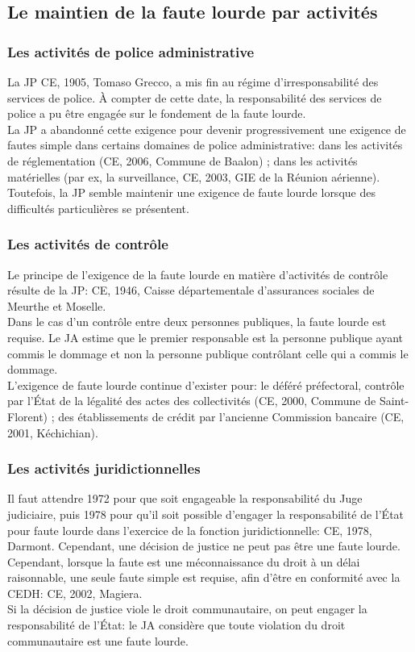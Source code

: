 \documentclass[10pt, a4paper, openany]{book}
\begin{document}
\subsection{Le maintien de la faute lourde par activités}

\subsubsection{Les activités de police administrative}

La JP CE, 1905, Tomaso Grecco, a mis fin au régime d'irresponsabilité des services de police. À compter de cette date, la responsabilité des services de police a pu être engagée sur le fondement de la faute lourde. \\
La JP a abandonné cette exigence pour devenir progressivement une exigence de fautes simple dans certains domaines de police administrative: dans les activités de réglementation (CE, 2006, Commune de Baalon) ; dans les activités matérielles (par ex, la surveillance, CE, 2003, GIE de la Réunion aérienne). \\
Toutefois, la JP semble maintenir une exigence de faute lourde lorsque des difficultés particulières se présentent. 

\subsubsection{Les activités de contrôle}

Le principe de l'exigence de la faute lourde en matière d'activités de contrôle résulte de la JP: CE, 1946, Caisse départementale d'assurances sociales de Meurthe et Moselle. \\
Dans le cas d'un contrôle entre deux personnes publiques, la faute lourde est requise. Le JA estime que le premier responsable est la personne publique ayant commis le dommage et non la personne publique contrôlant celle qui a commis le dommage. \\
L'exigence de faute lourde continue d'exister pour: le déféré préfectoral, contrôle par l'État de la légalité des actes des collectivités (CE, 2000, Commune de Saint-Florent) ; des établissements de crédit par l'ancienne Commission bancaire (CE, 2001, Kéchichian). 

\subsubsection{Les activités juridictionnelles}

Il faut attendre 1972 pour que soit engageable la responsabilité du Juge judiciaire, puis 1978 pour qu'il soit possible d'engager la responsabilité de l'État pour faute lourde dans l'exercice de la fonction juridictionnelle: CE, 1978, Darmont. Cependant, une décision de justice ne peut pas être une faute lourde. \\
Cependant, lorsque la faute est une méconnaissance du droit à un délai raisonnable, une seule faute simple est requise, afin d'être en conformité avec la CEDH: CE, 2002, Magiera. \\
Si la décision de justice viole le droit communautaire, on peut engager la responsabilité de l'État: le JA considère que toute violation du droit communautaire est une faute lourde. 
\end{document}
